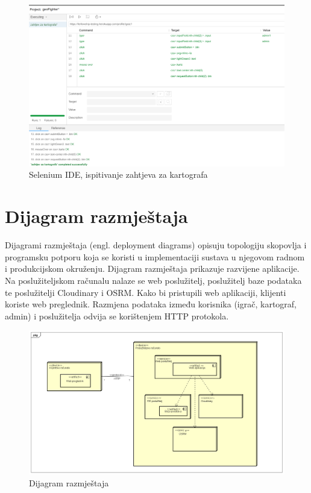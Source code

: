 					\begin{figure}[H]
						\includegraphics[width=\textwidth]{slike/SeleniumIDE_test2} 
						\centering
						\caption{Selenium IDE, ispitivanje zahtjeva za kartografa}
						\label{}
					\end{figure}
				
				
			\eject 
		
		
		\section{Dijagram razmještaja}
			
			
			
			{Dijagrami razmještaja (engl. deployment diagrams) opisuju topologiju skopovlja i programsku potporu koja se koristi u implementaciji sustava u njegovom radnom i produkcijskom okruženju. Dijagram razmještaja prikazuje razvijene aplikacije. Na poslužiteljskom računalu nalaze se web poslužitelj, poslužitelj baze podataka te poslužitelji Cloudinary i OSRM. Kako bi pristupili web aplikaciji, klijenti koriste web preglednik. Razmjena podataka između korisnika (igrač, kartograf, admin) i poslužitelja odvija se korištenjem HTTP protokola.}
			\begin{figure}[H]
				\includegraphics[width=\textwidth]{dijagrami/dijagram_razmjestaja} 
				\centering
				\caption{Dijagram razmještaja}
				\label{}
			\end{figure}
			\eject 
		
